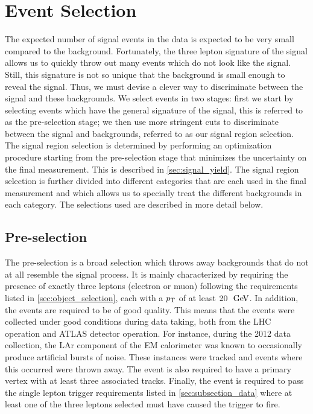 \section{Event Selection}
\label{sec:event_selection}

The expected number of signal events in the data is expected
to be very small compared to the background. %
Fortunately, the three lepton signature of the signal allows us to
quickly throw out many events which do not look like the signal.
Still, this signature is not so unique that the background
is small enough to reveal the signal. 
Thus, we must devise a clever way to discriminate 
between the signal and these backgrounds. We select
events in two stages: first we start
by selecting events which have the general signature of the signal, 
this is referred to as the pre-selection stage; we then 
use more stringent cuts to discriminate between the signal and backgrounds, 
referred to as our signal region selection.
The signal region selection is determined by performing an 
optimization procedure starting from the pre-selection stage 
that minimizes the uncertainty
on the final measurement.  This is described in \sec\ref{sec:signal_yield}.
The signal region selection is further divided into different
categories that are each used in the final measurement
and which allows us to specially treat the different backgrounds
in each category.  
The selections used are described in more detail below.




\subsection{Pre-selection}
\label{sec:preselection}

The pre-selection is a broad selection which throws
away backgrounds that do not at all resemble the signal process.
It is mainly characterized by requiring the presence of exactly three leptons
(electron or muon) following the requirements listed in 
\sec\ref{sec:object_selection}, each with a $p_{\mathrm{T}}$ of at least $20~\GeV$.
In addition, the events are required to be of good quality. This means
that the events were collected under good conditions during data taking,
both from the LHC operation and ATLAS detector operation. For instance,
during the 2012 data collection, the LAr component of the EM calorimeter
was known to occasionally produce artificial bursts of noise. These instances
were tracked and events where this occurred were thrown away. The event is 
also required to have a primary vertex with at least three associated tracks.
Finally, the event is required to pass the single lepton trigger
requirements listed in \sec\ref{sec:subsection_data} where 
at least one of the three leptons selected must have caused the trigger to fire.



